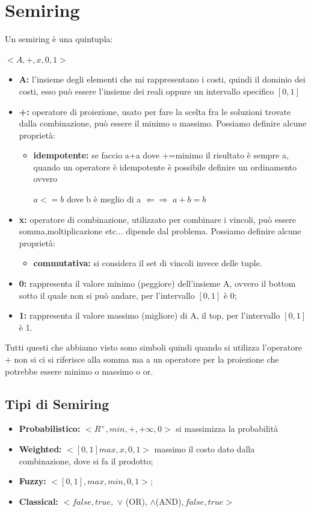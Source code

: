 \section{Semiring}
Un semiring è una quintupla:
\begin{center}
    $<A, +, x, 0, 1>$
\end{center}
\begin{itemize}
    \item \textbf{A:} l’insieme degli elementi che mi rappresentano i costi, quindi il dominio dei costi, esso può essere l’insieme dei reali oppure un intervallo specifico $[0,1]$
    \item \textbf{+:} operatore di proiezione, usato per fare la scelta fra le soluzioni trovate dalla combinazione, può essere il minimo o massimo. Possiamo definire alcune proprietà:
    \begin{itemize}
        \item \textbf{idempotente:} se faccio a+a dove +=minimo il risultato è sempre a, quando un operatore è idempotente è possibile definire un ordinamento ovvero
        \begin{center}
            $a <= b$ dove b è meglio di a $\Leftarrow \Rightarrow$ $a + b = b$
        \end{center}
    \end{itemize}
    \item \textbf{x:} operatore di combinazione, utilizzato per combinare i vincoli, può essere somma,moltiplicazione etc... dipende dal problema. Possiamo definire alcune proprietà:
    \begin{itemize}
        \item \textbf{commutativa:} si considera il set di vincoli invece delle tuple.
    \end{itemize}
    \item \textbf{0:} rappresenta il valore minimo (peggiore) dell’insieme A, ovvero il bottom sotto il quale non si può andare, per l’intervallo $[0,1]$ è 0;
    \item \textbf{1:} rappresenta il valore massimo (migliore) di A, il top, per l’intervallo $[0,1]$ è 1.
\end{itemize}
Tutti questi che abbiamo visto sono simboli quindi quando si utilizza l’operatore $+$ non si ci si riferisce alla somma ma a un operatore per la proiezione che potrebbe essere minimo o massimo o or.
\subsection{Tipi di Semiring}
\begin{itemize}
    \item \textbf{Probabilistico:} $< R^+ , min, +, +\infty, 0>$ si massimizza la probabilità
    \item \textbf{Weighted:} $<[0, 1] max,x,0,1>$ massimo il costo dato dalla combinazione, dove si fa il prodotto;
    \item \textbf{Fuzzy:} $<[0,1],max,min,0,1>;$
    \item \textbf{Classical:} $<{false,true},$ $\lor$ (OR), $\land$(AND)$, false, true>$
\end{itemize}
\newpage
